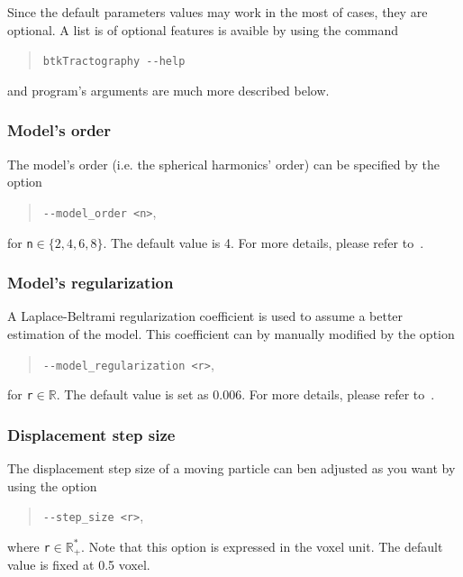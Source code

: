         Since the default parameters values may work in the most of cases, they are optional. A list is of optional features is avaible by using the command
            \begin{quote}
                \texttt{btkTractography -\hspace{0.1mm}-help}
            \end{quote}
        and program's arguments are much more described below.


    \subsubsection*{Model's order}
        The model's order (i.e. the spherical harmonics' order) can be specified by the option
            \begin{quote}
                \texttt{-\hspace{0.1mm}-model\_order <n>},
            \end{quote}
        for \texttt{n}$\in\{2,4,6,8\}$. The default value is 4. For more details, please refer to~\cite{descoteaux_regularized_2007}.

    \subsubsection*{Model's regularization}
        A Laplace-Beltrami regularization coefficient is used to assume a better estimation of the model. This coefficient can by manually modified by the option
            \begin{quote}
                \texttt{-\hspace{0.1mm}-model\_regularization <r>},
            \end{quote}
        for \texttt{r}$\in\mathbb{R}$. The default value is set as 0.006. For more details, please refer to~\cite{descoteaux_regularized_2007}.

    \subsubsection*{Displacement step size}
        The displacement step size of a moving particle can ben adjusted as you want by using the option
            \begin{quote}
                \texttt{-\hspace{0.1mm}-step\_size <r>},
            \end{quote}
        where \texttt{r}$\in\mathbb{R}_+^*$. Note that this option is expressed in the voxel unit. The default value is fixed at 0.5 voxel.

